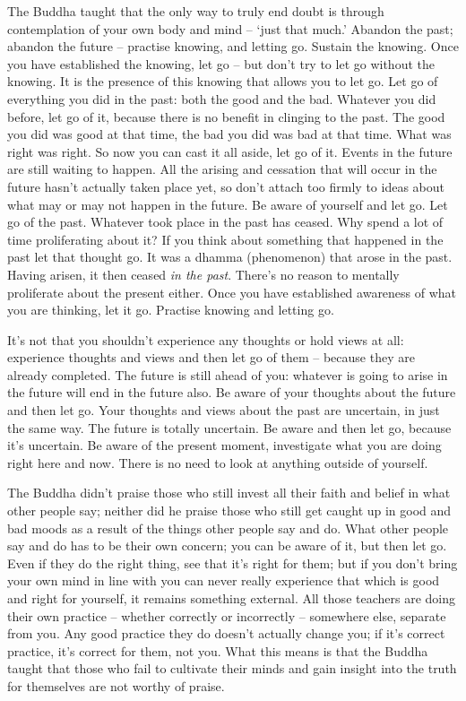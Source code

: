 The Buddha taught that the only way to truly end doubt is through contemplation of your own body and mind -- `just that much.' Abandon the past; abandon the future -- practise knowing, and letting go. Sustain the knowing. Once you have established the knowing, let go -- but don't try to let go without the knowing. It is the presence of this knowing that allows you to let go. Let go of everything you did in the past: both the good and the bad. Whatever you did before, let go of it, because there is no benefit in clinging to the past. The good you did was good at that time, the bad you did was bad at that time. What was right was right. So now you can cast it all aside, let go of it. Events in the future are still waiting to happen. All the arising and cessation that will occur in the future hasn't actually taken place yet, so don't attach too firmly to ideas about what may or may not happen in the future. Be aware of yourself and let go. Let go of the past. Whatever took place in the past has ceased. Why spend a lot of time proliferating about it? If you think about something that happened in the past let that thought go. It was a dhamma (phenomenon) that arose in the past. Having arisen, it then ceased \textit{in the past}. There's no reason to mentally proliferate about the present either. Once you have established awareness of what you are thinking, let it go. Practise knowing and letting go.

It's not that you shouldn't experience any thoughts or hold views at all: experience thoughts and views and then let go of them -- because they are already completed. The future is still ahead of you: whatever is going to arise in the future will end in the future also. Be aware of your thoughts about the future and then let go. Your thoughts and views about the past are uncertain, in just the same way. The future is totally uncertain. Be aware and then let go, because it's uncertain. Be aware of the present moment, investigate what you are doing right here and now. There is no need to look at anything outside of yourself.

The Buddha didn't praise those who still invest all their faith and belief in what other people say; neither did he praise those who still get caught up in good and bad moods as a result of the things other people say and do. What other people say and do has to be their own concern; you can be aware of it, but then let go. Even if they do the right thing, see that it's right for them; but if you don't bring your own mind in line with  you can never really experience that which is good and right for yourself, it remains something external. All those teachers are doing their own practice -- whether correctly or incorrectly -- somewhere else, separate from you. Any good practice they do doesn't actually change you; if it's correct practice, it's correct for them, not you. What this means is that the Buddha taught that those who fail to cultivate their minds and gain insight into the truth for themselves are not worthy of praise.

